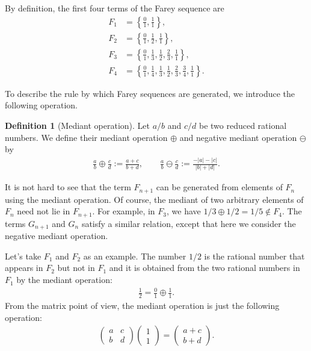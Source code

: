 \documentclass[10pt, a4paper]{article}
\theoremstyle{definition}
\newtheorem{definition}[theorem]{Definition}
\theoremstyle{remark}
\begin{document}
By definition, the first four terms of the Farey sequence are
\begin{align*}
    F_1 &= \left\{ \frac{0}{1}, \frac{1}{1} \right\},\\
    F_2 &= \left\{ \frac{0}{1}, \frac{1}{2}, \frac{1}{1} \right\},\\
    F_3 &= \left\{ \frac{0}{1}, \frac{1}{3}, \frac{1}{2}, \frac{2}{3}, \frac{1}{1} \right\},\\
    F_4 &= \left\{ \frac{0}{1}, \frac{1}{4}, \frac{1}{3}, \frac{1}{2}, \frac{2}{3}, \frac{3}{4}, \frac{1}{1} \right\}.
\end{align*}

To describe the rule by which Farey sequences are generated, we introduce the following operation.

\begin{definition}[Mediant operation]
    Let \(a/b\) and \(c/d\) be two reduced rational numbers. We define their mediant operation \(\oplus\) and negative mediant operation \(\ominus\) by
    \begin{align*}
        \frac{a}{b} \oplus \frac{c}{d}:= \frac{a+c}{b+d}, \qquad
        \frac{a}{b} \ominus \frac{c}{d}:= \frac{-|a|-|c|}{|b|+|d|}.
    \end{align*}
\end{definition}

It is not hard to see that the term \(F_{n+1}\) can be generated from elements of \(F_n\) using the mediant operation. Of course, the mediant of two arbitrary elements of \(F_n\) need not lie in \(F_{n+1}\). For example, in \(F_3\), we have
\(1/3\oplus 1/2=1/5\notin F_4\).
The terms \(G_{n+1}\) and \(G_n\) satisfy a similar relation, except that here we consider the negative mediant operation.

Let's take \(F_1\) and \(F_2\) as an example. The number \(1/2\) is the rational number that appears in \(F_2\) but not in \(F_1\) and it is obtained from the two rational numbers in \(F_1\) by the mediant operation:
\begin{align*}
    \frac{1}{2} = \frac{0}{1} \oplus \frac{1}{1}.
\end{align*}
From the matrix point of view, the mediant operation is just the following operation:
\begin{align*}
    \begin{pmatrix} a & c \\ b & d \end{pmatrix}
    \begin{pmatrix} 1\\1 \end{pmatrix}
    =
    \begin{pmatrix} a+c\\b+d \end{pmatrix}.
\end{align*}
\end{document}
